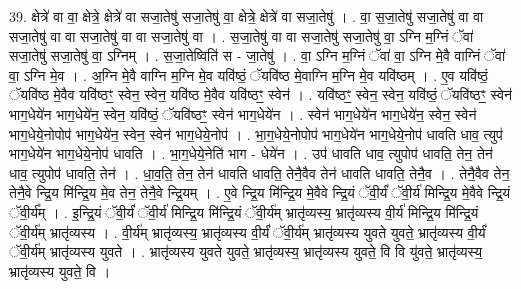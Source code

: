 \documentclass[17pt]{extarticle}
\begin{document}
39. क्षेत्रे॑ वा वा॒ क्षेत्रे॒ क्षेत्रे॑ वा सजा॒तेषु॑ सजा॒तेषु॑ वा॒ क्षेत्रे॒ क्षेत्रे॑ वा सजा॒तेषु॑ । . वा॒ स॒जा॒तेषु॑ सजा॒तेषु॑ वा वा सजा॒तेषु॑ वा वा सजा॒तेषु॑ वा वा सजा॒तेषु॑ वा । . स॒जा॒तेषु॑ वा वा सजा॒तेषु॑ सजा॒तेषु॑ वा॒ ऽग्नि म॒ग्निं ॅवा॑ सजा॒तेषु॑ सजा॒तेषु॑ वा॒ ऽग्निम् । . स॒जा॒तेष्विति॑ स - जा॒तेषु॑ । . वा॒ ऽग्नि म॒ग्निं ॅवा॑ वा॒ ऽग्नि मे॒वै वाग्निं ॅवा॑ वा॒ ऽग्नि मे॒व । . अ॒ग्नि मे॒वै वाग्नि म॒ग्नि मे॒व यवि॑ष्ठं॒ ॅयवि॑ष्ठ मे॒वाग्नि म॒ग्नि मे॒व यवि॑ष्ठम् । . ए॒व यवि॑ष्ठं॒ ॅयवि॑ष्ठ मे॒वैव यवि॑ष्ठꣳ॒॒ स्वेन॒ स्वेन॒ यवि॑ष्ठ मे॒वैव यवि॑ष्ठꣳ॒॒ स्वेन॑ । . यवि॑ष्ठꣳ॒॒ स्वेन॒ स्वेन॒ यवि॑ष्ठं॒ ॅयवि॑ष्ठꣳ॒॒ स्वेन॑ भाग॒धेये॑न भाग॒धेये॑न॒ स्वेन॒ यवि॑ष्ठं॒ ॅयवि॑ष्ठꣳ॒॒ स्वेन॑ भाग॒धेये॑न । . स्वेन॑ भाग॒धेये॑न भाग॒धेये॑न॒ स्वेन॒ स्वेन॑ भाग॒धेये॒नोपोप॑ भाग॒धेये॑न॒ स्वेन॒ स्वेन॑ भाग॒धेये॒नोप॑ । . भा॒ग॒धेये॒नोपोप॑ भाग॒धेये॑न भाग॒धेये॒नोप॑ धावति धाव॒ त्युप॑ भाग॒धेये॑न भाग॒धेये॒नोप॑ धावति । . भा॒ग॒धेये॒नेति॑ भाग - धेये॑न । . उप॑ धावति धाव॒ त्युपोप॑ धावति॒ तेन॒ तेन॑ धाव॒ त्युपोप॑ धावति॒ तेन॑ । . धा॒व॒ति॒ तेन॒ तेन॑ धावति धावति॒ तेनै॒वैव तेन॑ धावति धावति॒ तेनै॒व । . तेनै॒वैव तेन॒ तेनै॒वे न्द्रि॒य मि॑न्द्रि॒य मे॒व तेन॒ तेनै॒वे न्द्रि॒यम् । . ए॒वे न्द्रि॒य मि॑न्द्रि॒य मे॒वैवे न्द्रि॒यं ॅवी॒र्यं॑ ॅवी॒र्य॑ मिन्द्रि॒य मे॒वैवे न्द्रि॒यं ॅवी॒र्य᳚म् । . इ॒न्द्रि॒यं ॅवी॒र्यं॑ ॅवी॒र्य॑ मिन्द्रि॒य मि॑न्द्रि॒यं ॅवी॒र्य॑म् भ्रातृ॑व्यस्य॒ भ्रातृ॑व्यस्य वी॒र्य॑ मिन्द्रि॒य मि॑न्द्रि॒यं ॅवी॒र्य॑म् भ्रातृ॑व्यस्य । . वी॒र्य॑म् भ्रातृ॑व्यस्य॒ भ्रातृ॑व्यस्य वी॒र्यं॑ ॅवी॒र्य॑म् भ्रातृ॑व्यस्य युवते युवते॒ भ्रातृ॑व्यस्य वी॒र्यं॑ ॅवी॒र्य॑म् भ्रातृ॑व्यस्य युवते । . भ्रातृ॑व्यस्य युवते युवते॒ भ्रातृ॑व्यस्य॒ भ्रातृ॑व्यस्य युवते॒ वि वि यु॑वते॒ भ्रातृ॑व्यस्य॒ भ्रातृ॑व्यस्य युवते॒ वि । \newline
\pagebreak
{}
\end{document}
